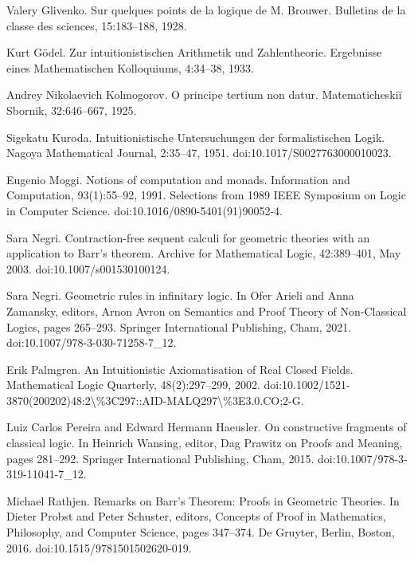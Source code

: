 \documentclass[10pt,a4paper]{article}
\begin{document}
\par\noindent  [11]  Valery Glivenko.  Sur quelques points de la logique de M. Brouwer.  Bulletins de la classe des sciences, 15:183–188, 1928.  
 
\par\noindent  [12]  Kurt Gödel.  Zur intuitionistischen Arithmetik und Zahlentheorie.  Ergebnisse eines Mathematischen Kolloquiums, 4:34–38, 1933.  
 
\par\noindent  [13]  Andrey Nikolaevich Kolmogorov.  O principe tertium non datur.  Matematicheskiĭ Sbornik, 32:646–667, 1925.  
 
\par\noindent  [14]  Sigekatu Kuroda.  Intuitionistische Untersuchungen der formalistischen Logik.  Nagoya Mathematical Journal, 2:35–47, 1951.  doi:10.1017/S0027763000010023.  
 
\par\noindent  [15]  Eugenio Moggi.  Notions of computation and monads.  Information and Computation, 93(1):55–92, 1991.  Selections from 1989 IEEE Symposium on Logic in Computer Science.  doi:10.1016/0890-5401(91)90052-4.  
 
\par\noindent  [16]  Sara Negri.  Contraction-free sequent calculi for geometric theories with an application to Barr’s theorem.  Archive for Mathematical Logic, 42:389–401, May 2003.  doi:10.1007/s001530100124.  
 
\par\noindent  [17]  Sara Negri.  Geometric rules in infinitary logic.  In Ofer Arieli and Anna Zamansky, editors, Arnon Avron on Semantics and Proof Theory of Non-Classical Logics, pages 265–293. Springer International Publishing, Cham, 2021.  doi:10.1007/978-3-030-71258-7\_12.  
 
\par\noindent  [18]  Erik Palmgren.  An Intuitionistic Axiomatisation of Real Closed Fields.  Mathematical Logic Quarterly, 48(2):297–299, 2002.  doi:10.1002/1521-3870(200202)48:2\textbackslash{}\%3C297::AID-MALQ297\textbackslash{}\%3E3.0.CO;2-G.  
 
\par\noindent  [19]  Luiz Carlos Pereira and Edward Hermann Haeusler.  On constructive fragments of classical logic.  In Heinrich Wansing, editor, Dag Prawitz on Proofs and Meaning, pages 281–292. Springer International Publishing, Cham, 2015.  doi:10.1007/978-3-319-11041-7\_12.  
 
\par\noindent  [20]  Michael Rathjen.  Remarks on Barr’s Theorem: Proofs in Geometric Theories.  In Dieter Probst and Peter Schuster, editors, Concepts of Proof in Mathematics, Philosophy, and Computer Science, pages 347–374. De Gruyter, Berlin, Boston, 2016.  doi:10.1515/9781501502620-019.  
 
\end{document}
